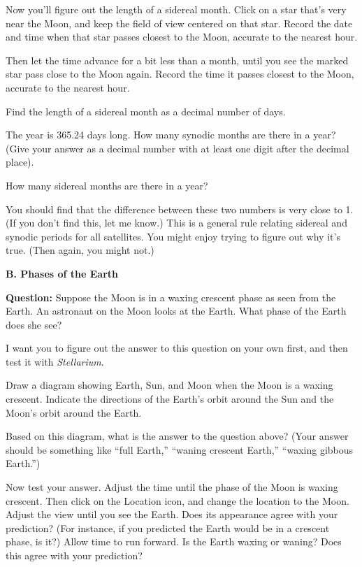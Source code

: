 \vskip 1in

Now you'll figure out the length of a sidereal month.  Click on a star
that's very near the Moon, and keep the field of view centered
on that star. Record the date and time
when that star passes closest to the Moon, accurate to the
nearest hour.  

\vskip 1in

Then let the time advance
for a bit less than a month, until you see the marked star pass close to the Moon
again.  Record the time it passes closest to the Moon, accurate
to the nearest hour.

\vskip 1in

Find the length of a sidereal month as a decimal number of days.

\vskip 1in

The year is 365.24 days long.  How many synodic months are there 
in a year? (Give your answer as a decimal number with at least one
digit after the decimal place).

\vskip 1in

How many sidereal months are there in a year?

\vskip 1in

You should find that the difference between these two numbers is
very close to 1.  (If you don't find this, let me know.)  This
is a general rule relating sidereal and synodic periods for
all satellites.  You might enjoy trying to figure out why
it's true.  (Then again, you might not.)

\bigskip

{\bf B. Phases of the Earth}

\medskip

{\bf Question:} 
Suppose the Moon is in a waxing crescent phase as seen from the
Earth.  An astronaut on the Moon looks at the Earth.  What
phase of the Earth does she see?

I want you to figure out the answer to this question on your
own first, and then test it with {\it Stellarium}.

Draw a diagram showing Earth, Sun, and Moon when the Moon is
a waxing crescent.  Indicate the directions of the Earth's orbit
around the Sun and the Moon's orbit around the Earth.

\vskip 2in

Based on this diagram, what is the answer to the question above?
(Your answer should be something like ``full Earth,'' ``waning
crescent Earth,'' ``waxing gibbous Earth.'')

\vskip 1in

Now test your answer.  Adjust the time until the phase of the Moon
is waxing crescent.  Then click on the Location icon, and
change the location to the Moon.
Adjust the view until you see the 
Earth.  Does its appearance agree with your prediction?  (For
instance, if you predicted the Earth would be in a crescent phase, is it?)
Allow time to run forward.  Is the Earth waxing or waning?
Does this agree with your prediction?

